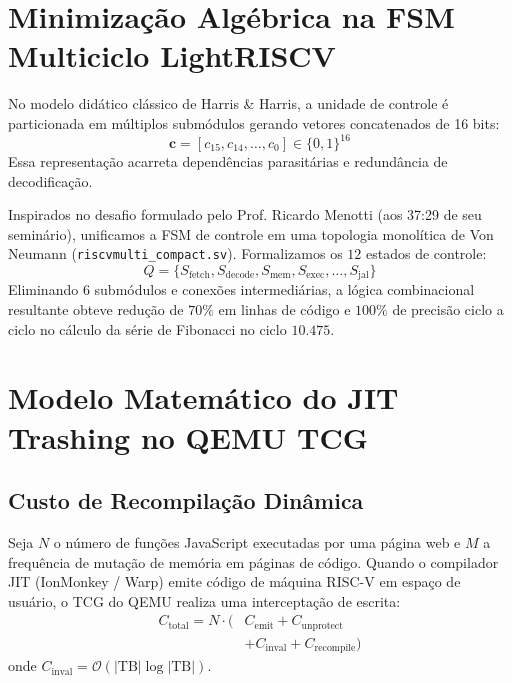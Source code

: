 \documentclass[10pt,twocolumn]{article}
\begin{document}
\section{Minimiza\c{c}\~ao Alg\'ebrica na FSM Multiciclo LightRISCV}

No modelo did\'atico cl\'assico de Harris \& Harris, a unidade de controle \'e particionada em m\'ultiplos subm\'odulos gerando vetores concatenados de 16 bits:
\begin{equation}
\mathbf{c} = [c_{15}, c_{14}, \dots, c_0] \in \{0, 1\}^{16}
\end{equation}
Essa representa\c{c}\~ao acarreta depend\^encias parasit\'arias e redund\^ancia de decodifica\c{c}\~ao.

Inspirados no desafio formulado pelo Prof. Ricardo Menotti (aos 37:29 de seu semin\'ario), unificamos a FSM de controle em uma topologia monol\'itica de Von Neumann (\texttt{riscvmulti\_compact.sv}). Formalizamos os $12$ estados de controle:
\begin{equation}
Q = \{S_{\text{fetch}}, S_{\text{decode}}, S_{\text{mem}}, S_{\text{exec}}, \dots, S_{\text{jal}}\}
\end{equation}
Eliminando 6 subm\'odulos e conex\~oes intermedi\'arias, a l\'ogica combinacional resultante obteve redu\c{c}\~ao de $70\%$ em linhas de c\'odigo e $100\%$ de precis\~ao ciclo a ciclo no c\'alculo da s\'erie de Fibonacci no ciclo $10.475$.

\section{Modelo Matem\'atico do JIT Trashing no QEMU TCG}

\subsection{Custo de Recompila\c{c}\~ao Din\^amica}
Seja $N$ o n\'umero de fun\c{c}\~oes JavaScript executadas por uma p\'agina web e $M$ a frequ\^encia de muta\c{c}\~ao de mem\'oria em p\'aginas de c\'odigo. Quando o compilador JIT (IonMonkey / Warp) emite c\'odigo de m\'aquina RISC-V em espa\c{c}o de usu\'ario, o TCG do QEMU realiza uma intercepta\c{c}\~ao de escrita:
\begin{equation}
\begin{aligned}
C_{\text{total}} = N \cdot ( & C_{\text{emit}} + C_{\text{unprotect}} \\
& + C_{\text{inval}} + C_{\text{recompile}} )
\end{aligned}
\end{equation}
onde $C_{\text{inval}} = \mathcal{O}(|\text{TB}| \log |\text{TB}|)$.
\end{document}
